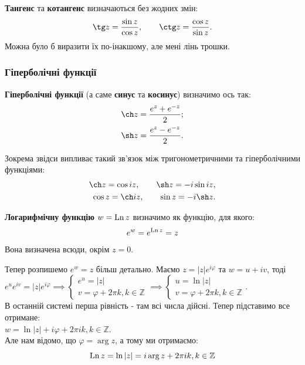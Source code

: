 \documentclass{math_library}
\begin{document}
\textbf{Тангенс} та \textbf{котангенс} визначаються без жодних змін:
\begin{align*}
\tg z = \dfrac{\sin z}{\cos z}, \qquad \ctg z = \dfrac{\cos z}{\sin z}.
\end{align*}
Можна було б виразити їх по-інакшому, але мені лінь трошки.

\subsubsection{Гіперболічні функції}
\begin{definition}
\textbf{Гіперболічні функції} (а саме \textbf{синус} та \textbf{косинус}) визначимо ось так:
\begin{align*}
\ch z = \dfrac{e^z + e^{-z}}{2}; \\
\sh z = \dfrac{e^z - e^{-z}}{2}.
\end{align*}
\end{definition}

\begin{remark}
Зокрема звідси випливає такий зв'язок між тригонометричними та гіперболічними функціями:
\begin{align*}
\ch z = \cos iz, \qquad \sh z = -i \sin iz, \\
\cos z = \ch iz, \qquad \sin z = -i \sh z.
\end{align*}
\end{remark}


\iffalse
\begin{definition}
\textbf{Логарифмічну функцію} $w = \operatorname{Ln} z$ визначимо як функцію, для якого:
\begin{align*}
e^w = e^{\operatorname{Ln} z} = z
\end{align*}
Вона визначена всюди, окрім $z = 0$.
\end{definition}

Тепер розпишемо $e^w = z$ більш детально. Маємо $z = |z| e^{i\varphi}$ та $w = u+iv$, тоді\\
$e^{u} e^{iv} = |z| e^{i\varphi} \implies \begin{cases} e^u = |z| \\ v = \varphi + 2\pi k, k \in \mathbb{Z} \end{cases} \implies \begin{cases} u = \ln |z| \\ v = \varphi + 2\pi k, k \in \mathbb{Z} \end{cases}$.\\
В останній системі перша рівність - там всі числа дійсні. Тепер підставимо все отримане:\\
$w = \ln |z| + i\varphi + 2\pi i k, k \in \mathbb{Z}$.\\
Але нам відомо, що $\varphi = \arg z$, а тому ми отримаємо:
$$ \operatorname{Ln} z = \ln |z| = i \arg z + 2\pi i k , k \in \mathbb{Z}$$
\end{document}
